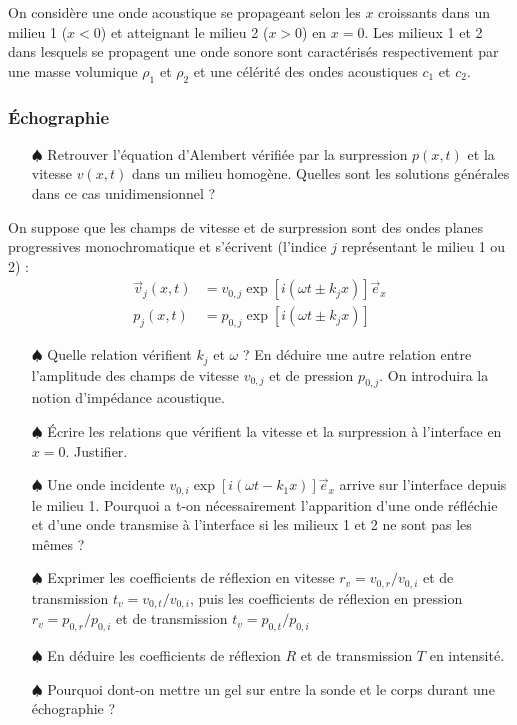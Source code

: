 \documentclass{report}
\begin{document}
On considère une onde acoustique se propageant selon les $x$ croissants dans un milieu 1 ($x<0$) et atteignant le milieu 2 ($x>0$) en $x=0$. Les milieux 1 et 2 dans lesquels se propagent une onde sonore sont caractérisés respectivement par une masse volumique $\rho_1$ et $\rho_2$ et une célérité des ondes acoustiques $c_1$ et $c_2$. 

\subsubsection*{Échographie}

\begin{itemize}
	
	\item[$\spadesuit$] Retrouver l'équation d'Alembert vérifiée par la surpression $p(x,t)$ et la vitesse $v(x,t)$ dans un milieu homogène. Quelles sont les solutions générales dans ce cas unidimensionnel ? 

\end{itemize}	
	
On suppose que les champs de vitesse et de surpression sont des ondes planes progressives monochromatique et s'écrivent (l'indice $j$ représentant le milieu 1 ou 2) :
\begin{align*}
	\vec{v}_j(x,t)&=v_{0,j}\exp\left[i(\omega t\pm k_jx ) \right] \vec{e}_x \\
	p_j(x,t)&=p_{0,j}\exp\left[i(\omega t \pm k_jx ) \right]
\end{align*}

\begin{itemize}
	
	\item[$\spadesuit$] Quelle relation vérifient $k_j$ et $\omega$ ? En déduire une autre relation entre l'amplitude des champs de vitesse $v_{0,j}$ et de pression $p_{0,j}$. On introduira la notion d'impédance acoustique.
	
	\item[$\spadesuit$] Écrire les relations que vérifient la vitesse et la surpression à l'interface en $x=0$. Justifier. 
	
	\item[$\spadesuit$] Une onde incidente $v_{0,i}\exp\left[i(\omega t - k_1x) \right] \vec{e}_x$  arrive sur l'interface depuis le milieu 1. Pourquoi a t-on nécessairement l'apparition d'une onde réfléchie et d'une onde transmise à l'interface si les milieux 1 et 2 ne sont pas les mêmes ?
	
	\item[$\spadesuit$] Exprimer les coefficients de réflexion en vitesse $r_v=v_{0,r}/v_{0,i}$ et de transmission $t_v=v_{0,t}/v_{0,i}$, puis les coefficients de réflexion en pression $r_v=p_{0,r}/p_{0,i}$ et de transmission $t_v=p_{0,t}/p_{0,i}$
	
	\item[$\spadesuit$]	 En déduire les coefficients de réflexion $R$ et de transmission $T$ en intensité. 
	
	\item[$\spadesuit$] Pourquoi dont-on mettre un gel sur entre la sonde et le corps durant une échographie ? 
		
\end{itemize}
\end{document}
